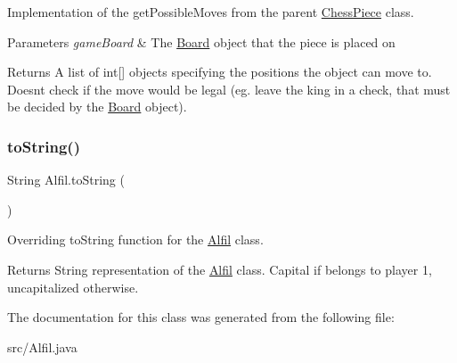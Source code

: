 Implementation of the get\+Possible\+Moves from the parent \mbox{\hyperlink{class_chess_piece}{Chess\+Piece}} class. 
\begin{DoxyParams}{Parameters}
{\em game\+Board} & The \mbox{\hyperlink{class_board}{Board}} object that the piece is placed on \\
\hline
\end{DoxyParams}
\begin{DoxyReturn}{Returns}
A list of int\mbox{[}\mbox{]} objects specifying the positions the object can move to. Doesn\textquotesingle{}t check if the move would be legal (eg. leave the king in a check, that must be decided by the \mbox{\hyperlink{class_board}{Board}} object). 
\end{DoxyReturn}
\mbox{\label{class_alfil_a938b5529d7278101329f7d2878c7f3b8}} 
\subsubsection{\texorpdfstring{to\+String()}{toString()}}
{\footnotesize\ttfamily String Alfil.\+to\+String (\begin{DoxyParamCaption}{ }\end{DoxyParamCaption})}

Overriding to\+String function for the \mbox{\hyperlink{class_alfil}{Alfil}} class. \begin{DoxyReturn}{Returns}
String representation of the \mbox{\hyperlink{class_alfil}{Alfil}} class. Capital if belongs to player 1, uncapitalized otherwise. 
\end{DoxyReturn}


The documentation for this class was generated from the following file\+:\begin{DoxyCompactItemize}
\item 
src/Alfil.\+java\end{DoxyCompactItemize}
